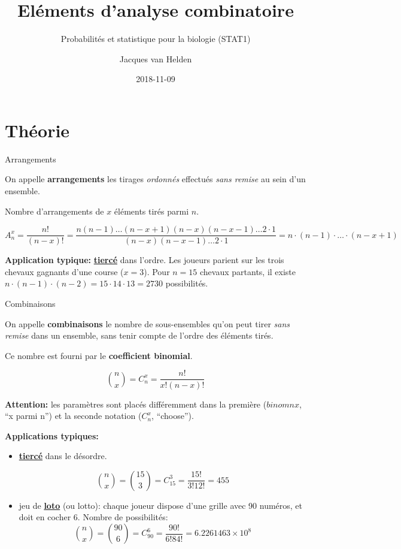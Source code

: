 \documentclass[ignorenonframetext,]{beamer}
\title{Eléments d'analyse combinatoire}
\subtitle{Probabilités et statistique pour la biologie (STAT1)}
\author{Jacques van Helden}
\date{2018-11-09}
\begin{document}
\frame{\titlepage}

\begin{frame}
\tableofcontents[hideallsubsections]
\end{frame}

\section{Théorie}\label{theorie}

\begin{frame}{Arrangements}

On appelle \textbf{arrangements} les tirages \emph{ordonnés} effectués
\emph{sans remise} au sein d'un ensemble.

Nombre d'arrangements de \(x\) éléments tirés parmi \(n\).

\[A^x_n = \frac{n!}{(n - x)!} = \frac{n(n-1) \ldots (n-x +1) (n - x) (n-x-1) \ldots 2 \cdot 1}{(n - x) (n-x-1) \ldots 2 \cdot 1} = n \cdot (n-1) \cdot \ldots \cdot (n-x+1)\]

\textbf{Application typique:}
\textbf{\href{https://fr.wikipedia.org/wiki/Tierc\%C3\%A9_(jeu)}{tiercé}}
dans l'ordre. Les joueurs parient sur les trois chevaux gagnants d'une
course (\(x=3\)). Pour \(n=15\) chevaux partants, il existe
\(n \cdot (n-1) \cdot (n-2) = 15 \cdot 14 \cdot 13 = 2730\)
possibilités.

\end{frame}

\begin{frame}{Combinaisons}

On appelle \textbf{combinaisons} le nombre de sous-ensembles qu'on peut
tirer \emph{sans remise} dans un ensemble, sans tenir compte de l'ordre
des éléments tirés.

Ce nombre est fourni par le \textbf{coefficient binomial}.

\[\binom{n}{x} = C^x_n = \frac{n!}{x! (n-x)!}\]

\textbf{Attention: } les paramètres sont placés différemment dans la
première (\(binom{n}{x}\), ``x parmi n'') et la seconde notation
(\(C^x_n\), ``choose'').

\textbf{Applications typiques: }

\begin{itemize}
\item
  \textbf{\href{https://fr.wikipedia.org/wiki/Tierc\%C3\%A9_(jeu)}{tiercé}}
  dans le désordre.

  \[\binom{n}{x} = \binom{15}{3} = C^3_{15} = \frac{15!}{3! 12!} = 455\]
\item
  jeu de \textbf{\href{https://fr.wikipedia.org/wiki/Loto}{loto}} (ou
  lotto): chaque joueur dispose d'une grille avec 90 numéros, et doit en
  cocher 6. Nombre de possibilités:
  \[\binom{n}{x} = \binom{90}{6} = C^6_{90} = \frac{90!}{6! 84!} = 6.2261463\times 10^{8}\]
\end{itemize}

\end{frame}
\end{document}

